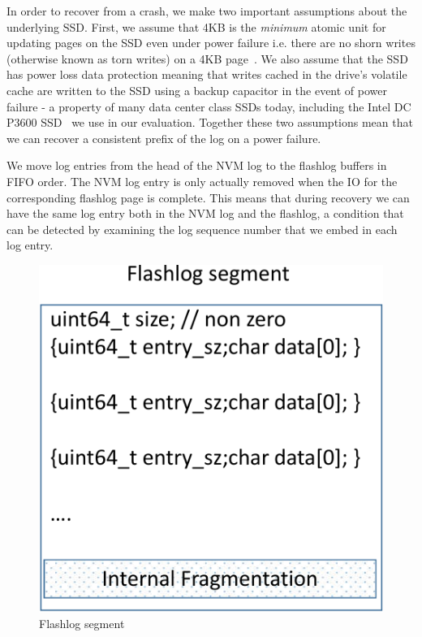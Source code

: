 \documentclass[pageno]{jpaper}
\begin{document}
In order to recover from a crash, we make two important assumptions about the
underlying SSD. First, we assume that 4KB is the \emph{minimum} atomic unit for
updating pages on the SSD even under power failure i.e. there are no shorn
writes (otherwise known as torn writes) on a 4KB page~\cite{shorn_writes}. We
also assume that the SSD has power loss data protection meaning that writes
cached in the drive's volatile cache are written to the SSD using a backup
capacitor in the event of power failure - a property of many data center class
SSDs today, including the Intel DC P3600 SSD~\cite{ssd_spec} we use in our
evaluation. Together these two assumptions mean that we can recover a consistent
prefix of the log on a power failure.

We move log entries from the head of the NVM log to the flashlog buffers in FIFO
order. The NVM log entry is only actually removed when the IO for the
corresponding flashlog page is complete. This means that during recovery we can
have the same log entry both in the NVM log and the flashlog, a condition that
can be detected by examining the log sequence number that we embed in each log
entry.

\begin{figure}
  \centering
  \includegraphics[scale=0.4]{figures2/flashlog_page.pdf}
  \caption{Flashlog segment}
  \label{fig:flashlog_page}
\end{figure}
\end{document}
